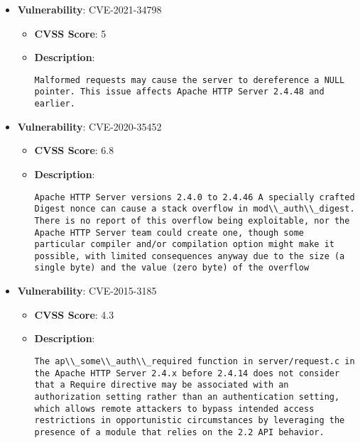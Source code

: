 \documentclass{article}
\begin{document}
\begin{itemize}
        \item \textbf{Vulnerability}: CVE-2021-34798
        \begin{itemize}
            \item \textbf{CVSS Score}:  5 
            \item \textbf{Description}:
            \parbox[t]{0.9\linewidth}{
                \verb|Malformed requests may cause the server to dereference a NULL pointer. This issue affects Apache HTTP Server 2.4.48 and earlier.|
            }
        \end{itemize}
    
        \item \textbf{Vulnerability}: CVE-2020-35452
        \begin{itemize}
            \item \textbf{CVSS Score}:  6.8 
            \item \textbf{Description}:
            \parbox[t]{0.9\linewidth}{
                \verb|Apache HTTP Server versions 2.4.0 to 2.4.46 A specially crafted Digest nonce can cause a stack overflow in mod\\_auth\\_digest. There is no report of this overflow being exploitable, nor the Apache HTTP Server team could create one, though some particular compiler and/or compilation option might make it possible, with limited consequences anyway due to the size (a single byte) and the value (zero byte) of the overflow|
            }
        \end{itemize}
    
        \item \textbf{Vulnerability}: CVE-2015-3185
        \begin{itemize}
            \item \textbf{CVSS Score}:  4.3 
            \item \textbf{Description}:
            \parbox[t]{0.9\linewidth}{
                \verb|The ap\\_some\\_auth\\_required function in server/request.c in the Apache HTTP Server 2.4.x before 2.4.14 does not consider that a Require directive may be associated with an authorization setting rather than an authentication setting, which allows remote attackers to bypass intended access restrictions in opportunistic circumstances by leveraging the presence of a module that relies on the 2.2 API behavior.|
            }
        \end{itemize}
    

\end{itemize}
\end{document}
